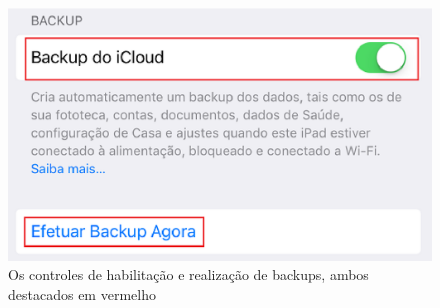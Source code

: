 \begin{figure}[h]
  \centering
  \includegraphics{imagem6.eps}
  \caption{Os controles de habilita\c c\~ao e realiza\c c\~ao de backups, ambos destacados em vermelho}
\end{figure}
